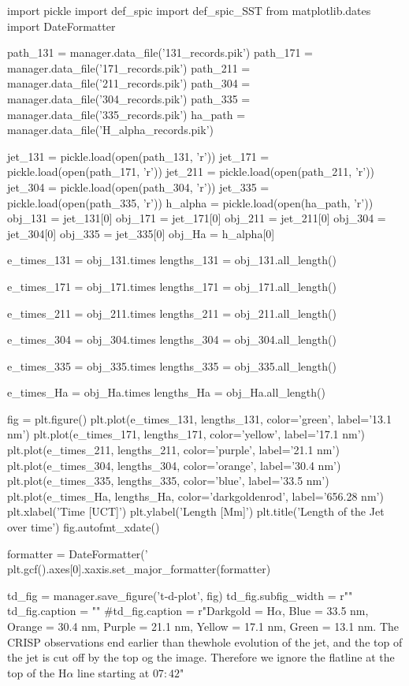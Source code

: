 \documentclass{emulateapj}
\begin{document}
\begin{pycode}[T-D-plots]
import pickle
import def_spic
import def_spic_SST
from matplotlib.dates import DateFormatter

path_131 = manager.data_file('131_records.pik')
path_171 = manager.data_file('171_records.pik')
path_211 = manager.data_file('211_records.pik')
path_304 = manager.data_file('304_records.pik')
path_335 = manager.data_file('335_records.pik')
ha_path = manager.data_file('H_alpha_records.pik')

jet_131 = pickle.load(open(path_131, 'r'))
jet_171 = pickle.load(open(path_171, 'r'))
jet_211 = pickle.load(open(path_211, 'r'))
jet_304 = pickle.load(open(path_304, 'r'))
jet_335 = pickle.load(open(path_335, 'r'))
h_alpha = pickle.load(open(ha_path, 'r'))
obj_131 = jet_131[0]
obj_171 = jet_171[0]
obj_211 = jet_211[0]
obj_304 = jet_304[0]
obj_335 = jet_335[0]
obj_Ha = h_alpha[0]

e_times_131 = obj_131.times
lengths_131 = obj_131.all_length()

e_times_171 = obj_171.times
lengths_171 = obj_171.all_length()

e_times_211 = obj_211.times
lengths_211 = obj_211.all_length()

e_times_304 = obj_304.times
lengths_304 = obj_304.all_length()

e_times_335 = obj_335.times
lengths_335 = obj_335.all_length()

e_times_Ha = obj_Ha.times
lengths_Ha = obj_Ha.all_length()

fig = plt.figure()
plt.plot(e_times_131, lengths_131, color='green', label='13.1 nm')
plt.plot(e_times_171, lengths_171, color='yellow', label='17.1 nm')
plt.plot(e_times_211, lengths_211, color='purple', label='21.1 nm')
plt.plot(e_times_304, lengths_304, color='orange', label='30.4 nm')
plt.plot(e_times_335, lengths_335, color='blue', label='33.5 nm')
plt.plot(e_times_Ha, lengths_Ha, color='darkgoldenrod', label='656.28 nm')
plt.xlabel('Time [UCT]')
plt.ylabel('Length [Mm]')
plt.title('Length of the Jet over time')
fig.autofmt_xdate()

formatter = DateFormatter('%
plt.gcf().axes[0].xaxis.set_major_formatter(formatter)

td_fig = manager.save_figure('t-d-plot', fig)
td_fig.subfig_width = r"\columnwidth"
td_fig.caption = ""
#td_fig.caption = r"Darkgold = H$\alpha$, Blue = 33.5 nm, Orange = 30.4 nm, Purple = 21.1 nm, Yellow = 17.1 nm, Green = 13.1 nm. The CRISP observations end earlier than thewhole evolution of the jet, and the top of the jet is cut off by the top og the image. Therefore we ignore the flatline at the top of the H$\alpha$ line starting at $07:42$"
\end{pycode}
\end{document}
